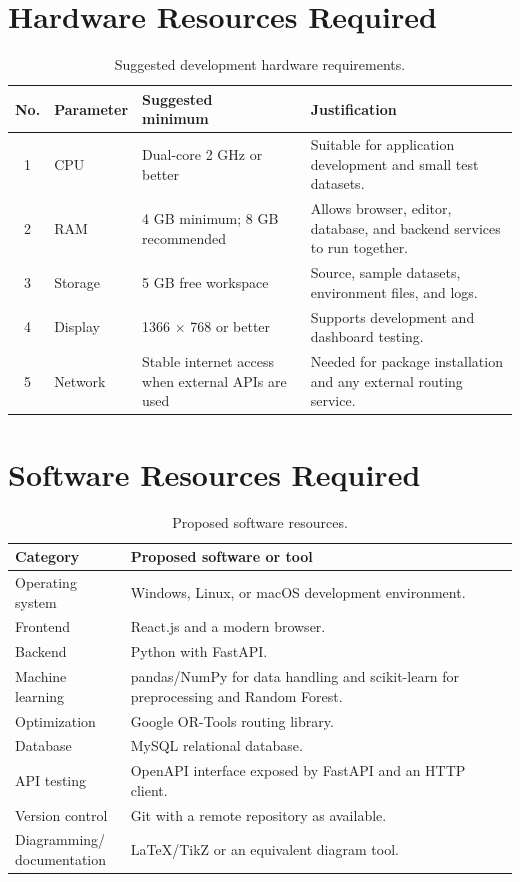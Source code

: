 \documentclass[12pt,a4paper,oneside]{report}
\begin{document}
\section{Hardware Resources Required}
\begin{table}[htbp]
\centering
\begin{tabularx}{\textwidth}{c p{35mm} p{35mm} X}
\toprule
\textbf{No.} & \textbf{Parameter} & \shortstack[l]{\textbf{Suggested}\\\textbf{minimum}} & \textbf{Justification}\\
\midrule
1 & CPU & Dual-core 2 GHz or better & Suitable for application development and small test datasets.\\
2 & RAM & 4 GB minimum; 8 GB recommended & Allows browser, editor, database, and backend services to run together.\\
3 & Storage & 5 GB free workspace & Source, sample datasets, environment files, and logs.\\
4 & Display & 1366 $\times$ 768 or better & Supports development and dashboard testing.\\
5 & Network & Stable internet access when external APIs are used & Needed for package installation and any external routing service.\\
\bottomrule
\end{tabularx}
\caption{Suggested development hardware requirements.}
\end{table}

\section{Software Resources Required}
\begin{table}[htbp]
\centering
\begin{tabularx}{\textwidth}{p{36mm}X}
\toprule
\textbf{Category} & \textbf{Proposed software or tool}\\
\midrule
Operating system & Windows, Linux, or macOS development environment.\\
Frontend & React.js and a modern browser.\\
Backend & Python with FastAPI.\\
Machine learning & pandas/NumPy for data handling and scikit-learn for preprocessing and Random Forest.\\
Optimization & Google OR-Tools routing library.\\
Database & MySQL relational database.\\
API testing & OpenAPI interface exposed by FastAPI and an HTTP client.\\
Version control & Git with a remote repository as available.\\
\shortstack[l]{Diagramming/\\documentation} & LaTeX/TikZ or an equivalent diagram tool.\\
\bottomrule
\end{tabularx}
\caption{Proposed software resources.}
\end{table}
\end{document}
